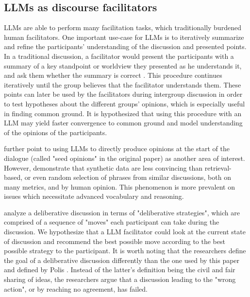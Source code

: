 \subsection{LLMs as discourse facilitators}
\label{sec:related:discource}


LLMs are able to perform many facilitation tasks, which traditionally burdened human facilitators. One important use-case for LLMs is to iteratively summarize and refine the participants' understanding of the discussion and presented points. In a traditional discussion, a facilitator would present the participants with a summary of a key standpoint or worldview they presented as he understands it, and ask them whether the summary is correct \cite{small-polis-llm, Tsai2024Generative}. This procedure continues iteratively until the group believes that the facilitator understands them. These points can later be used by the facilitators during intergroup discussion in order to test hypotheses about the different groups' opinions, which is especially useful in finding common ground. It is hypothesized \cite{small-polis-llm} that using this procedure with an LLM may yield faster convergence to common ground and model understanding of the opinions of the participants. 

\citet{small-polis-llm} further point to using LLMs to directly produce opinions at the start of the dialogue (called "seed opinions" in the original paper) as another area of interest. However, \citet{karadzhov2023delidata} demonstrate that synthetic data are less convincing than retrieval-based, or even random selection of phrases from similar discussions, both on many metrics, and by human opinion. This phenomenon is more prevalent on issues which necessitate advanced vocabulary and reasoning.

\citet{al-khatib-etal-2018-modeling} analyze a deliberative discussion in terms of "deliberative strategies", which are comprised of a sequence of "moves" each participant can take during the discussion. We hypothesize that a LLM facilitator could look at the current state of discussion and recommend the best possible move according to the best possible strategy to the participant. It is worth noting that the researchers define the goal of a deliberative discussion differently than the one used by this paper and defined by Polis \cite{small-polis-llm}. Instead of the latter's definition being the civil and fair sharing of ideas, the researchers argue that a discussion leading to the "wrong action", or by reaching no agreement, has failed.

